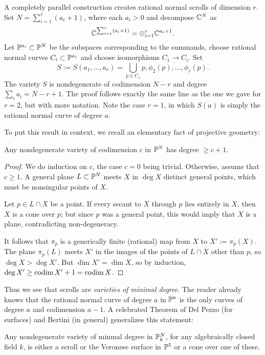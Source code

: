 A completely parallel construction creates rational normal scrolls of dimension $r$. Set $N = \sum_{i=1}^{r}(a_{i}+1)$, where each $a_{i}>0$ and
decompose $\CC^{N}$ as
$$
\CC^{\sum_{i=1}^{r}(a_{i}+1)} = \oplus_{i=1}^{r}\CC^{a_{i}+1}.
$$
Let $\PP^{a_{i}}\subset \PP^{N}$ be the subspaces corresponding to the summands,  choose
rational normal curves $C_{i}\subset \PP^{a_{i}}$ and choose isomorphisms $C_{1}\to C_{i}$. 
Set
$$
S:=S(a_{1}, \dots, a_{r}) = \bigcup_{p\in C_{1}}\overline{p, \phi_{2}(p), \dots, \phi_{r}(p)}.
$$
The variety $S$ is nondegenerate of codimension $N-r$ and degree $\sum_{i}a_{i} = N-r+1$. The proof follows exactly the same line as the one we gave for $r=2$, but with more notation.
Note the case $r=1$, in which $S(a)$ is simply the rational normal curve of degree $a$. 

To put this result in context, we recall an elementary fact of projective geometry:
 
\begin{proposition}\label{minimal degree}
 Any nondegenerate variety of codimension $c$ in $\PP^{N}$ has degree $\geq c +1$.
\end{proposition}

\begin{proof} We do induction on $c$, the case $c=0$ being trivial.
 Otherwise, assume that $c\geq1$. A general plane $L\subset \PP^{N}$ meets $X$ in $\deg X$
 distinct general points, which must be nonsingular points of $X$.
 
Let $p\in L\cap X$ be a point. If every secant to $X$ through $p$ lies entirely in $X$, then $X$ is a cone over $p$; but since $p$ was a general point, this would imply that $X$ is a plane, contradicting non-degeneracy. 

It follows that $\pi_{p}$ is a generically finite (rational) map from $X$ to $X' := \pi_{p}(X)$. The plane 
$\pi_{p}(L)$ meets $X'$ in the images of the points of $L\cap X$ other than $p$, so
$\deg X>\deg X'$. But 
$\dim X' = \dim X$, so by induction, $\deg X' \geq \codim X'+1 = \codim X$. 
\end{proof}

Thus we see that scrolls are \emph{varieties of minimal degree}. The reader already knows that the rational normal curve of degree $a$ in $\PP^{a}$ is the only curves of degree $a$ and codimension $a-1$. A celebrated Theorem of Del Pezzo (for surfaces) and Bertini (in general) generalizes this statement:

\begin{theorem}\label{classification of scrolls}
 Any nondegenerate variety of minmal degree in $\PP_{k}^{N}$, for any algebraically closed field $k$, is either a scroll or the Veronese surface in $\PP^{5}$ or a cone over one of these.
\end{theorem}

